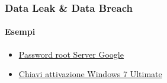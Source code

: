 \begin{exampleframe}
    \frametitle{Data Leak \& Data Breach}
    \framesubtitle{Esempi}

    \begin{itemize}
        \item \href{https://www.reddit.com/r/ProgrammerHumor/comments/17co7vv/hackingin2024/}{Password root Server Google}
        \item \href{https://www.reddit.com/r/ChatGPT/comments/14bpla2/thanks_grandma_one_of_the_keys_worked_for_windows/}{Chiavi attivazione Windows 7 Ultimate}
    \end{itemize}
\end{exampleframe}

